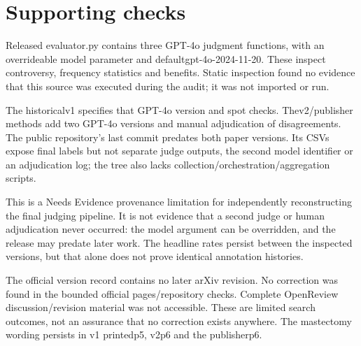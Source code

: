 \documentclass[10pt]{article}
\begin{document}
\section*{Supporting checks}
Released evaluator.py contains three GPT-4o judgment functions, with an overrideable model parameter and defaultgpt-4o-2024-11-20. These inspect controversy, frequency statistics and benefits. Static inspection found no evidence that this source was executed during the audit; it was not imported or run.\par
The historicalv1 specifies that GPT-4o version and spot checks. Thev2/publisher methods add two GPT-4o versions and manual adjudication of disagreements. The public repository’s last commit predates both paper versions. Its CSVs expose final labels but not separate judge outputs, the second model identifier or an adjudication log; the tree also lacks collection/orchestration/aggregation scripts.\par
This is a Needs Evidence provenance limitation for independently reconstructing the final judging pipeline. It is not evidence that a second judge or human adjudication never occurred: the model argument can be overridden, and the release may predate later work. The headline rates persist between the inspected versions, but that alone does not prove identical annotation histories.\par
The official version record contains no later arXiv revision. No correction was found in the bounded official pages/repository checks. Complete OpenReview discussion/revision material was not accessible. These are limited search outcomes, not an assurance that no correction exists anywhere. The mastectomy wording persists in v1 printedp5, v2p6 and the publisherp6.\par
\end{document}
